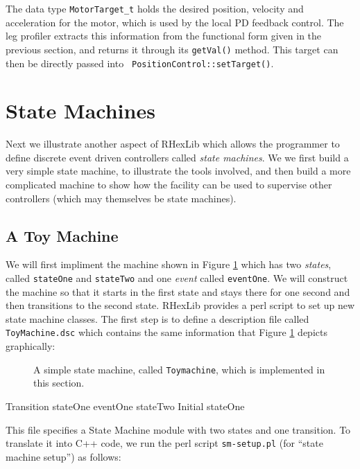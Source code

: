 The data type {\tt MotorTarget\_t} holds the desired position, velocity and
acceleration for the motor, which is used by the local PD feedback
control. The leg profiler extracts this information from the functional form
given in the previous section, and returns it through its {\tt getVal()}
method. This target can then be directly passed into {\tt
PositionControl::setTarget()}.

\section{State Machines}

Next we illustrate another aspect of RHexLib which allows the programmer to
define discrete event driven controllers called {\em state machines}. We we
first build a very simple state machine, to illustrate the tools involved,
and then build a more complicated machine to show how the facility can be
used to supervise other controllers (which may themselves be state
machines).

\subsection{A Toy Machine}

We will first impliment the machine shown in Figure \ref{fig-toymachine}
which has two {\em states}, called {\tt stateOne} and {\tt stateTwo} and one
{\em event} called {\tt eventOne}. We will construct the machine so that it
starts in the first state and stays there for one second and then
transitions to the second state. RHexLib provides a perl script to set up
new state machine classes. The first step is to define a description file
called {\tt ToyMachine.dsc} which contains the same information that Figure
\ref{fig-toymachine} depicts graphically:

\begin{figure}[t]
\begin{center}
\caption{A simple state machine, called {\tt Toymachine}, which is implemented
in this section. \label{fig-toymachine}
}\end{center}
\end{figure}

\begin{codesegment}
  Transition stateOne eventOne stateTwo
  Initial stateOne
\end{codesegment}

\noindent This file specifies a State Machine module with two states and one transition. To
translate it into C++ code, we run the perl script {\tt sm-setup.pl} (for
``state machine setup'') as follows:

